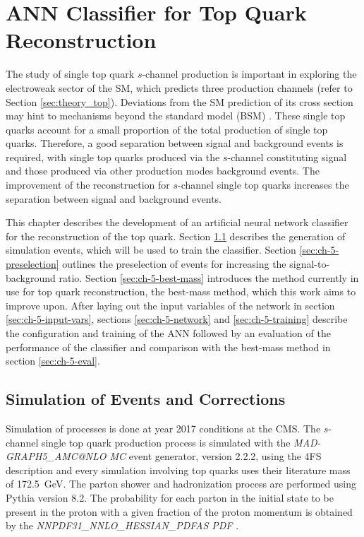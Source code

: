 \chapter{ANN Classifier for Top Quark Reconstruction}
\label{ch:classifier}
The study of single top quark $s$-channel production is important in exploring the electroweak sector of the SM, which predicts three production channels (refer to Section \ref{sec:theory_top}). Deviations from the SM prediction of its cross section may hint to mechanisms beyond the standard model (BSM) \cite{CMS16}. These single top quarks account for a small proportion of the total production of single top quarks. Therefore, a good separation between signal and background events is required, with single top quarks produced via the $s$-channel constituting signal and those produced via other production modes background events. The improvement of the reconstruction for $s$-channel single top quarks increases the separation between signal and background events.

This chapter describes the development of an artificial neural network classifier for the reconstruction of the top quark.
Section \ref{sec:ch-5-simulation} describes the generation of simulation events, which will be used to train the classifier. Section \ref{sec:ch-5-preselection} outlines the preselection of events for increasing the signal-to-background ratio. Section \ref{sec:ch-5-best-mass} introduces the method currently in use for top quark reconstruction, the best-mass method, which this work aims to improve upon. After laying out the input variables of the network in section \ref{sec:ch-5-input-vars}, sections \ref{sec:ch-5-network} and \ref{sec:ch-5-training} describe the configuration and training of the ANN followed by an evaluation of the performance of the classifier and comparison with the best-mass method in section \ref{sec:ch-5-eval}.

\section{Simulation of Events and Corrections}
\label{sec:ch-5-simulation}
Simulation of processes is done at year 2017 conditions at the CMS. The $s$-channel single top quark production process is simulated with the \emph{MAD-GRAPH5\_AMC@NLO MC} event generator, version 2.2.2, using the 4FS description \cite{Fal18} and every simulation involving top quarks uses their literature mass of \SI{172.5}{GeV}. The parton shower and hadronization process are performed using Pythia version 8.2. The probability for each parton in the initial state to be present in the proton with a given fraction of the proton momentum is obtained by the \emph{NNPDF31\_NNLO\_HESSIAN\_PDFAS PDF} \cite{Fal18}.

